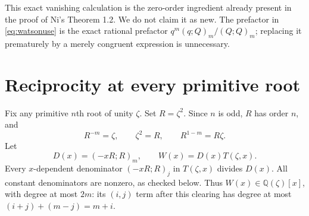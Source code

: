 \documentclass[11pt]{article}
\newcommand{\qp}[3]{(#1;#2)_{#3}}
\begin{document}
This exact vanishing calculation is the zero-order ingredient already
present in the proof of Ni's Theorem 1.2. We do not claim it as new.
The prefactor in \eqref{eq:watsonuse} is the exact rational prefactor
$q^m\qp{q}{Q}{m}/\qp{Q}{Q}{m}$; replacing it prematurely by a merely
congruent expression is unnecessary.

\section{Reciprocity at every primitive root}
Fix any primitive $n$th root of unity $\zeta$. Set $R=\zeta^2$. Since $n$ is
odd, $R$ has order $n$, and
\begin{equation}\label{eq:relations}
 R^{-m}=\zeta,\qquad \zeta^2=R,\qquad R^{1-m}=R\zeta.
\end{equation}
Let
\begin{equation}\label{eq:W}
 D(x)=\qp{-xR}{R}{m},\qquad W(x)=D(x)T(\zeta,x).
\end{equation}
Every $x$-dependent denominator $\qp{-xR}{R}{j}$ in $T(\zeta,x)$ divides
$D(x)$. All constant denominators are nonzero, as checked below. Thus
$W(x)\in\mathbb Q(\zeta)[x]$, with degree at most $2m$: its $(i,j)$ term
after this clearing has degree at most $(i+j)+(m-j)=m+i$.
\end{document}
